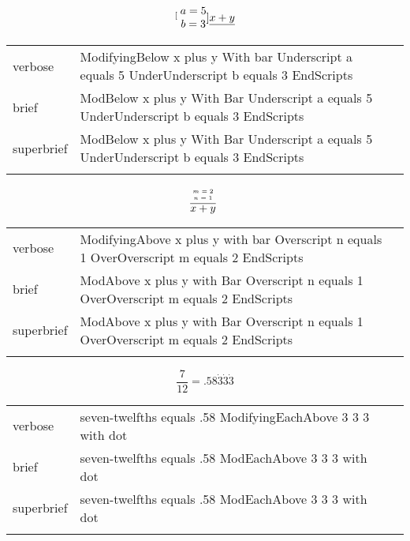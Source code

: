 \R
\E \[\stackrel[\tiny
\begin{matrix}
  a=5  \\ b=3
\end{matrix}
]{\underline{x+y}}{}\]

\begin{longtable}[c]{@{}lll@{}}
\toprule\addlinespace
verbose & ModifyingBelow x plus y With bar Underscript a equals 5
UnderUnderscript b equals 3 EndScripts &

\\\addlinespace
brief & ModBelow x plus y With Bar Underscript a equals 5
UnderUnderscript b equals 3 EndScripts &

\\\addlinespace
superbrief & ModBelow x plus y With Bar Underscript a equals 5
UnderUnderscript b equals 3 EndScripts &

\\\addlinespace
\bottomrule
\end{longtable}


\E \[\stackrel{\tiny
\begin{matrix}
  m=2  \\ n=1
\end{matrix}
}{\overline{x+y}}{}\]

\begin{longtable}[c]{@{}lll@{}}
\toprule\addlinespace
verbose & ModifyingAbove x plus y with bar Overscript n equals 1
OverOverscript m equals 2 EndScripts &

\\\addlinespace
brief & ModAbove x plus y with Bar Overscript n equals 1 OverOverscript
m equals 2 EndScripts &

\\\addlinespace
superbrief & ModAbove x plus y with Bar Overscript n equals 1
OverOverscript m equals 2 EndScripts &

\\\addlinespace
\bottomrule
\end{longtable}

\R
\E \[\frac{7}{12}=.58\dot{3}\dot{3}\dot{3}\]
\begin{longtable}[c]{@{}lll@{}}
\toprule\addlinespace
verbose & seven-twelfths equals .58 ModifyingEachAbove 3 3 3 with dot &

\\\addlinespace
brief & seven-twelfths equals .58 ModEachAbove 3 3 3 with dot &

\\\addlinespace
superbrief & seven-twelfths equals .58 ModEachAbove 3 3 3 with dot &

\\\addlinespace
\bottomrule
\end{longtable}



